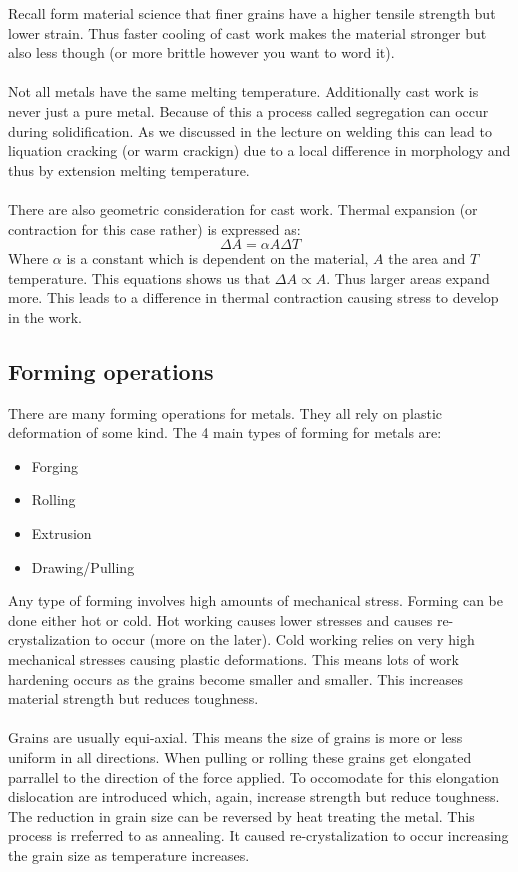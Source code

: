 \documentclass[11pt, a4paper]{article}
\begin{document}
Recall form material science that finer grains have a higher tensile strength but lower strain. Thus faster cooling of cast work makes the material stronger but also less though (or more brittle however you want to word it).\\
\\
Not all metals have the same melting temperature. Additionally cast work is never just a pure metal. Because of this a process called segregation can occur during solidification. As we discussed in the lecture on welding this can lead to liquation cracking (or warm crackign) due to a local difference in morphology and thus by extension melting temperature.\\
\\
There are also geometric consideration for cast work. Thermal expansion (or contraction for this case rather) is expressed as:
\begin{equation}
  \Delta A = \alpha A \Delta T
\end{equation}
Where $\alpha$ is a constant which is dependent on the material, $A$ the area and $T$ temperature. This equations shows us that $\Delta A \propto A$. Thus larger areas expand more. This leads to a difference in thermal contraction causing stress to develop in the work.


\subsection{Forming operations}
There are many forming operations for metals. They all rely on plastic deformation of some kind. The 4 main types of forming for metals are:
\begin{itemize}
  \item Forging
  \item Rolling
  \item Extrusion
  \item Drawing/Pulling
\end{itemize}
Any type of forming involves high amounts of mechanical stress. Forming can be done either hot or cold. Hot working causes lower stresses and causes re-crystalization to occur (more on the later). Cold working relies on very high mechanical stresses causing plastic deformations. This means lots of work hardening occurs as the grains become smaller and smaller. This increases material strength but reduces toughness.\\
\\
Grains are usually equi-axial. This means the size of grains is more or less uniform in all directions. When pulling or rolling these grains get elongated parrallel to the direction of the force applied. To occomodate for this elongation dislocation are introduced which, again, increase strength but reduce toughness. The reduction in grain size can be reversed by heat treating the metal. This process is rreferred to as annealing. It caused re-crystalization to occur increasing the grain size as temperature increases.
\end{document}
